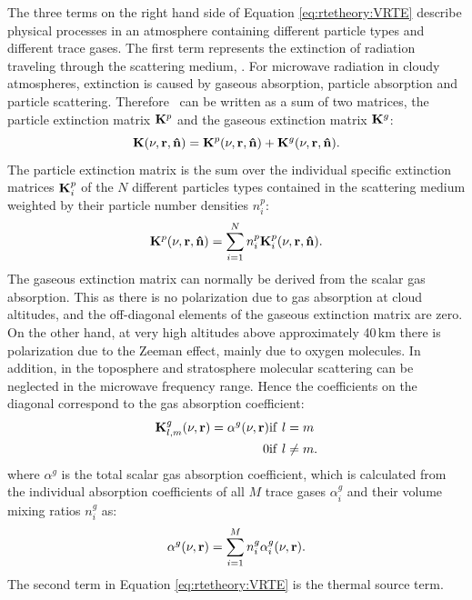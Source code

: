 The three terms on the right hand side of Equation \ref{eq:rtetheory:VRTE}
describe physical processes in an atmosphere containing different particle
types and different trace gases. The first term represents the extinction of
radiation traveling through the scattering medium, \ExtMat. For microwave
radiation in cloudy atmospheres, extinction is caused by gaseous absorption,
particle absorption and particle scattering. Therefore \ExtMat\ can be written
as a sum of two matrices, the particle extinction matrix ${\bf K}^{p}$ and the
gaseous extinction matrix ${\bf K}^{g}$:
\begin{equation}
  {\bf K}(\nu,{\bf r},{\bf \hat{n}}) = {\bf K}^{p}(\nu,{\bf r},{\bf \hat{n}})+
  {\bf K}^{g}(\nu,{\bf r},{\bf \hat{n}}).
\end{equation}
The particle extinction matrix is the sum over the individual specific
extinction matrices ${\bf K}_i^p$ of the $N$ different particles types
contained in the scattering medium weighted by their particle number densities
$n^p_i$:
\begin{equation}
  {\bf K}^{p}(\nu,{\bf r},{\bf \hat{n}}) =
  \sum_{i=1}^N n^p_i {\bf K}_i^p(\nu,{\bf r},{\bf \hat{n}}).
\label{eq:rtetheory:ext_mat_p}
\end{equation}
The gaseous extinction matrix can
normally be derived from the scalar gas absorption. This as there is no
polarization due to gas absorption at cloud altitudes, and the off-diagonal
elements of the gaseous extinction matrix are zero. On the other hand, at very
high altitudes above approximately 40\,km there is polarization due to the
Zeeman effect, mainly due to oxygen molecules. In addition, in the toposphere
and stratosphere molecular scattering can be neglected in the microwave
frequency range. Hence the coefficients on the diagonal correspond to the gas
absorption coefficient:
\begin{eqnarray}
{\bf K}^{g}_{l,m}(\nu,{\bf r}) = \alpha^g(\nu,{\bf r}) & 
    \mathrm{if }\ l = m \nonumber \\
    0 & \mathrm{if }\ l \neq m.
\label{eq:rtetheory:Kgas}
\end{eqnarray}
where $\alpha^g$ is the total scalar gas absorption coefficient, which is
calculated from the individual absorption coefficients of all $M$
trace gases $\alpha_i^g$ and their volume mixing ratios
$n^g_i$ as:
\begin{equation}
   \alpha^g(\nu,{\bf r}) =  \sum_{i=1}^M  n^g_i \alpha_i^g(\nu,{\bf r}).
\end{equation}
The second term in Equation \ref{eq:rtetheory:VRTE} is the thermal source term.
